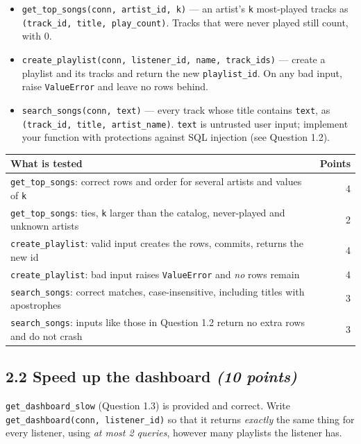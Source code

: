 \documentclass[11pt]{article}
\newcommand{\code}[1]{\texttt{#1}}
\newcommand{\pts}[1]{\hfill\textit{(#1 points)}}
\begin{document}
\begin{itemize}
  \item \code{get\_top\_songs(conn, artist\_id, k)} --- an artist's \code{k}
  most-played tracks as \code{(track\_id, title, play\_count)}. Tracks that were
  never played still count, with 0.
  \item \code{create\_playlist(conn, listener\_id, name, track\_ids)} --- create
  a playlist and its tracks and return the new \code{playlist\_id}. On any bad input, raise \code{ValueError} and leave no rows behind.
  \item \code{search\_songs(conn, text)} --- every track whose title contains
  \code{text}, as \code{(track\_id, title, artist\_name)}. \code{text} is
  untrusted user input; implement your function with protections against SQL injection (see Question 1.2).
\end{itemize}

\begin{center}
\small
\begin{tabularx}{\linewidth}{@{}X r@{}}
\toprule
\textbf{What is tested} & \textbf{Points}\\
\midrule
\code{get\_top\_songs}: correct rows and order for several artists and values of \code{k} & 4\\
\code{get\_top\_songs}: ties, \code{k} larger than the catalog, never-played and unknown artists & 2\\
\code{create\_playlist}: valid input creates the rows, commits, returns the new id & 4\\
\code{create\_playlist}: bad input raises \code{ValueError} and \emph{no} rows remain & 4\\
\code{search\_songs}: correct matches, case-insensitive, including titles with apostrophes & 3\\
\code{search\_songs}: inputs like those in Question 1.2 return no extra rows and do not crash & 3\\
\bottomrule
\end{tabularx}
\end{center}

\subsection*{2.2 Speed up the dashboard \pts{10}}

\code{get\_dashboard\_slow} (Question 1.3) is provided and correct. Write
\code{get\_dashboard(conn, listener\_id)} so that it returns \emph{exactly} the
same thing for every listener, using \emph{at most 2 queries}, however many
playlists the listener has.
\end{document}
